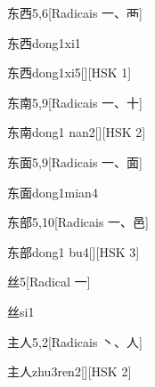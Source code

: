 \begin{entry}{东西}{5,6}[Radicais ⼀、⾑]
  \begin{phonetics}{东西}{dong1xi1}
  \end{phonetics}
  \begin{phonetics}{东西}{dong1xi5}[][HSK 1]
  \end{phonetics}
\end{entry}

\begin{entry}{东南}{5,9}[Radicais ⼀、⼗]
  \begin{phonetics}{东南}{dong1 nan2}[][HSK 2]
  \end{phonetics}
\end{entry}

\begin{entry}{东面}{5,9}[Radicais ⼀、⾯]
  \begin{phonetics}{东面}{dong1mian4}
  \end{phonetics}
\end{entry}

\begin{entry}{东部}{5,10}[Radicais ⼀、⾢]
  \begin{phonetics}{东部}{dong1 bu4}[][HSK 3]
  \end{phonetics}
\end{entry}

\begin{entry}{丝}{5}[Radical ⼀]
  \begin{phonetics}{丝}{si1}
  \end{phonetics}
\end{entry}

\begin{entry}{主人}{5,2}[Radicais ⼂、⼈]
  \begin{phonetics}{主人}{zhu3ren2}[][HSK 2]
  \end{phonetics}
\end{entry}


